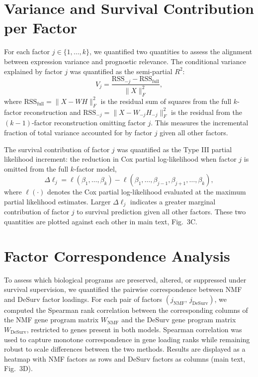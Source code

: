 \documentclass[
]{article}
\begin{document}
\section{Variance and Survival Contribution per Factor}

For each factor \(j \in \{1, \ldots, k\}\), we quantified two quantities
to assess the alignment between expression variance and prognostic
relevance. The conditional variance explained by factor \(j\) was
quantified as the semi-partial \(R^2\):
\[V_j = \frac{\mathrm{RSS}_{-j} - \mathrm{RSS}_{\text{full}}}{\|X\|_F^2},\]
where \(\mathrm{RSS}_{\text{full}} = \|X - WH\|_F^2\) is the residual
sum of squares from the full \(k\)-factor reconstruction and
\(\mathrm{RSS}_{-j} = \|X - W_{-j}H_{-j}\|_F^2\) is the residual from
the \((k-1)\)-factor reconstruction omitting factor \(j\). This measures
the incremental fraction of total variance accounted for by factor \(j\)
given all other factors.

The survival contribution of factor \(j\) was quantified as the Type III
partial likelihood increment: the reduction in Cox partial
log-likelihood when factor \(j\) is omitted from the full \(k\)-factor
model,
\[\Delta\ell_j = \ell(\beta_1, \ldots, \beta_k) - \ell(\beta_1, \ldots,
\beta_{j-1}, \beta_{j+1}, \ldots, \beta_k),\] where \(\ell(\cdot)\)
denotes the Cox partial log-likelihood evaluated at the maximum partial
likelihood estimates. Larger \(\Delta\ell_j\) indicates a greater
marginal contribution of factor \(j\) to survival prediction given all
other factors. These two quantities are plotted against each other in
main text, Fig.~3C.

\section{Factor Correspondence Analysis}

To assess which biological programs are preserved, altered, or
suppressed under survival supervision, we quantified the pairwise
correspondence between NMF and DeSurv factor loadings. For each pair of
factors \((j_{\text{NMF}},\, j_{\text{DeSurv}})\), we computed the
Spearman rank correlation between the corresponding columns of the NMF
gene program matrix \(W_{\text{NMF}}\) and the DeSurv gene program
matrix \(W_{\text{DeSurv}}\), restricted to genes present in both
models. Spearman correlation was used to capture monotone correspondence
in gene loading ranks while remaining robust to scale differences
between the two methods. Results are displayed as a heatmap with NMF
factors as rows and DeSurv factors as columns (main text, Fig.~3D).
\end{document}
